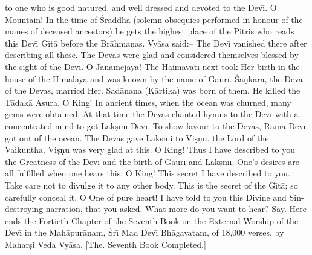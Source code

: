 to one who is good natured, and well dressed and devoted to the Dev\={\i}. O Mountain! In the time of \'Sr\=addha (solemn obsequies performed in honour of the manes of deceased ancestors) he gets the highest place of the Pitris who reads this Dev\={\i} G\={\i}t\=a before the Br\=ahma\d{n}as. Vy\=asa said:-- The Dev\={\i} vanished there after describing all these. The Devas were glad and considered themselves blessed by the sight of the Dev\={\i}. O Janamejaya! The Haimavat\={\i} next took Her birth in the house of the Him\=alay\=a and was known by the name of Gaur\={\i}. \'S\=a\d{n}kara, the Deva of the Devas, marricd Her. Sad\=anana (K\=artika) was born of them. He killed the T\=adak\=a Asura. O King! In ancient times, when the ocean was churned, many gems were obtained. At that time the Devas chanted hymns to the Dev\={\i} with a concentrated mind to get Lak\d{s}m\={\i} Dev\={\i}. To show favour to the Devas, Ram\=a Dev\={\i} got out of the ocean. The Devas gave Laksmi to Vi\d{s}\d{n}u, the Lord of the Vaikuntha. Vi\d{s}\d{n}u was very glad at this. O King! Thus I have described to you the Greatness of the Dev\={\i} and the birth of Gaur\={\i} and Lak\d{s}m\={\i}. One's desires are all fulfilled when one hears this. O King! This secret I have described to you. Take care not to divulge it to any other body. This is the secret of the G\={\i}t\=a; so carefully conceal it. O One of pure heart! I have told to you this Divine and Sin-destroying narration, that you asked. What more do you want to hear? Say.
Here ends the Fortieth Chapter of the Seventh Book on the External Worship of the Dev\={\i} in the Mah\=apur\=a\d{n}am, \'Sr\={\i} Mad Dev\={\i} Bh\=agavatam, of 18,000 verses, by Mahar\d{s}i Veda Vy\=asa.
[The. Seventh Book Completed.]



